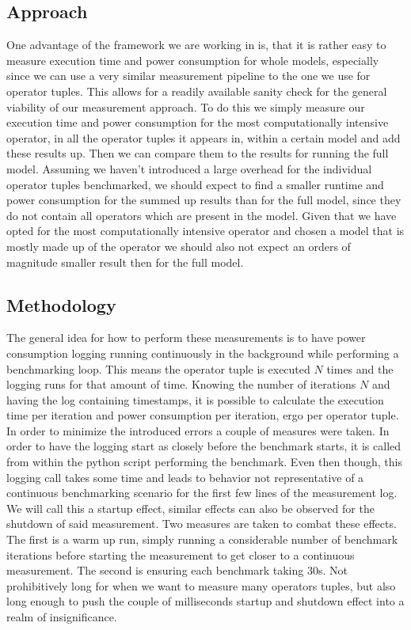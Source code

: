 \documentclass[conference]{IEEEtran}
\begin{document}
\subsection{Approach}
One advantage of the framework we are working in is, that it is rather easy to measure execution time and power consumption for whole models, especially since we can use a very similar measurement pipeline to the one we use for operator tuples. This allows for a readily available sanity check for the general viability of our measurement approach. To do this we simply measure our execution time and power consumption for the most computationally intensive operator, in all the operator tuples it appears in, within a certain model and add these results up. Then we can compare them to the results for running the full model. Assuming we haven’t introduced a large overhead for the individual operator tuples benchmarked, we should expect to find a smaller runtime and power consumption for the summed up results than for the full model, since they do not contain all operators which are present in the model. Given that we have opted for the most computationally intensive operator and chosen a model that is mostly made up of the operator we should also not expect an orders of magnitude smaller result then for the full model. 

\subsection{Methodology}
The general idea for how to perform these measurements is to have power consumption logging running continuously in the background while performing a benchmarking loop. This means the operator tuple is executed $N$ times and the logging runs for that amount of time. Knowing the number of iterations $N$ and having the log containing timestamps, it is possible to calculate the execution time per iteration and power consumption per iteration, ergo per operator tuple. \\
In order to minimize the introduced errors a couple of measures were taken. In order to have the logging start as closely before the benchmark starts, it is called from within the python script performing the benchmark. Even then though, this logging call takes some time and leads to behavior not representative of a continuous benchmarking scenario for the first few lines of the measurement log. We will call this a startup effect, similar effects can also be observed for the shutdown of said measurement. Two measures are taken to combat these effects. The first is a warm up run, simply running a considerable number of benchmark iterations before starting the measurement to get closer to a continuous measurement. The second is ensuring each benchmark taking 30s. Not prohibitively long for when we want to measure many operators tuples, but also long enough to push the couple of milliseconds startup and shutdown effect into a realm of insignificance.
\end{document}
